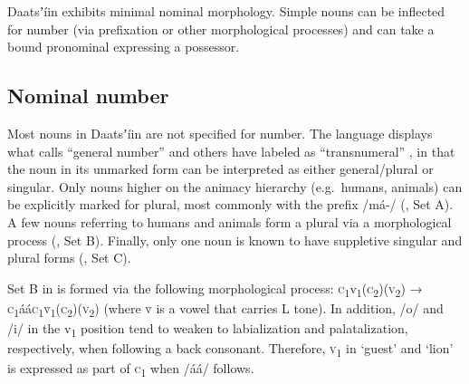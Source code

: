 \documentclass[output=paper]{langsci/langscibook}
\begin{document}
Daatsʼíin exhibits minimal nominal morphology. Simple nouns can be inflected for number (via prefixation or other morphological processes) and can take a bound  pronominal expressing a possessor.  

\subsection{Nominal number}\label{sec:ahlandc:7.1}


Most nouns in Daatsʼíin are not specified for number. The language displays what \citet{Corbett2000} calls “general number” and others have labeled as “transnumeral” \citep{Biermann1982,StorchDimmendaal2014}, in that the noun in its unmarked form can be interpreted as either general/plural or singular. Only nouns higher on the animacy hierarchy (e.g.\ humans, animals) can be explicitly marked for plural, most commonly with the prefix /má-/ (, Set A). A few nouns referring to humans and animals form a plural via a morphological process (, Set B). Finally, only one noun is known to have suppletive singular and plural forms (, Set C).

Set B in  is formed via the following morphological process: \textsc{c}\textsubscript{1}v\textsubscript{1}(\textsc{c}\textsubscript{2})(\textsc{v}\textsubscript{2}) → \textsc{c}\textsubscript{1}áá\textsc{c}\textsubscript{1}\textsc{\`{v}}\textsubscript{1}(\textsc{c}\textsubscript{2})(\textsc{v}\textsubscript{2}) (where \textsc{\`{v}} is a vowel that carries L tone). In addition, /o/ and /i/ in the v\textsubscript{1} position tend to weaken to labialization and palatalization, respectively, when following a back consonant. Therefore, \textsc{v}\textsubscript{1} in ‘guest’ and ‘lion’ is expressed as part of \textsc{c}\textsubscript{1} when /áá/ follows.
\end{document}
